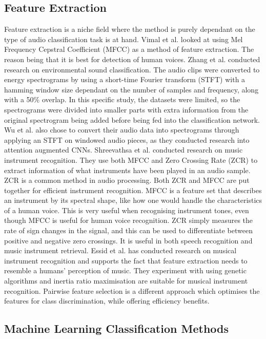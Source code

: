 \subsection{Feature Extraction} \label{ss: FE}

Feature extraction is a niche field where the method is purely dependant on the type of audio classification task is at hand. Vimal et al. looked at using Mel Frequency Cepstral Coefficient (MFCC) as a method of feature extraction. The reason being that it is best for detection of human voices. Zhang et al. conducted research on environmental sound classification. The audio clips were converted to energy spectrograms by using a short-time Fourier transform (STFT) with a hamming window size dependant on the number of samples and frequency, along with a 50\% overlap. In this specific study, the datasets were limited, so the spectrograms were divided into smaller parts with extra information from the original spectrogram being added before being fed into the classification network. Wu et al. also chose to convert their audio data into spectrograms through applying an STFT on windowed audio pieces, as they conducted research into attention augmented CNNs. 
Shreevathsa et al. conducted research on music instrument recognition. They use both MFCC and Zero Crossing Rate (ZCR) to extract information of what instruments have been played in an audio sample. ZCR is a common method in audio processing. Both ZCR and MFCC are put together for efficient instrument recognition. MFCC is a feature set that describes an instrument by its spectral shape, like how one would handle the characteristics of a human voice. This is very useful when recognising instrument tones, even though MFCC is useful for human voice recognition. ZCR simply measures the rate of sign changes in the signal, and this can be used to differentiate between positive and negative zero crossings. It is useful in both speech recognition and music instrument retrieval. Essid et al. has conducted research on musical instrument recognition and supports the fact that feature extraction needs to resemble a humans’ perception of music. They experiment with using genetic algorithms and inertia ratio maximisation are suitable for musical instrument recognition. Pairwise feature selection is a different approach which optimises the features for class discrimination, while offering efficiency benefits. 

\subsection{Machine Learning Classification Methods} \label{ss: MLCM}

